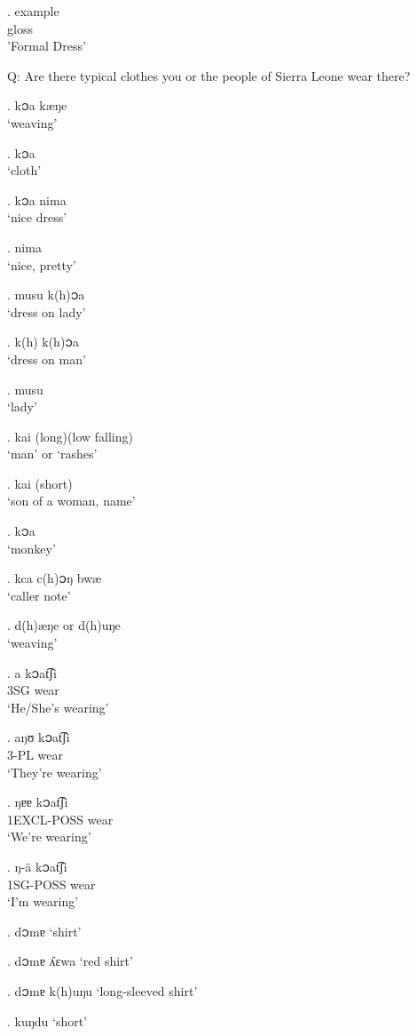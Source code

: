 \documentclass{assets/fieldnotes}
\begin{document}
\exg. example\\
gloss\\
'Formal Dress' 

Q: Are there typical clothes you or the people of Sierra Leone wear there?

\ex. k၁a kæŋe \\
`weaving'

\ex. k၁a \\
`cloth'

\ex. k၁a nima \\
`nice dress'

\ex. nima \\
`nice, pretty'

\ex. musu k(h)၁a \\
`dress on lady'

\ex. k(h) k(h)၁a \\
`dress on man'

\ex. musu \\
`lady'

\ex. kai (long)(low falling)\\
`man' or `rashes'

\ex. kai (short) \\
`son of a woman, name'

\ex. k၁a \\
`monkey'

\ex. kca  c(h)၁ŋ bwæ\\
`caller note'

\ex. d(h)æŋe or d(h)uŋe  \\
`weaving'

\exg. a k၁at͡ʃi \\
3SG wear\\
`He/She's wearing'

\ex. aŋʊ k၁at͡ʃi \\
3-PL wear\\
`They're wearing'

\exg. ŋɐɐ k၁at͡ʃi\\
1EXCL-POSS wear\\
`We're wearing'

\exg. ŋ-ä k၁at͡ʃi\\
1SG-POSS wear\\
`I'm wearing'

\ex. d၁mɐ
`shirt'

\ex. d၁mɐ ʎɛwa
`red shirt'

\ex. d၁mɐ k(h)uŋu
`long-sleeved shirt'

\ex. kuŋdu
`short'
\end{document}
